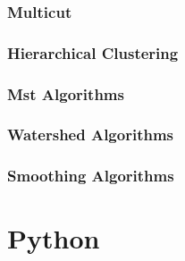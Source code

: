     \subsubsection{Multicut}

    \subsubsection{Hierarchical Clustering}

    \subsubsection{Mst Algorithms}

    \subsubsection{Watershed Algorithms}

    \subsubsection{Smoothing Algorithms}





\section{Python}




